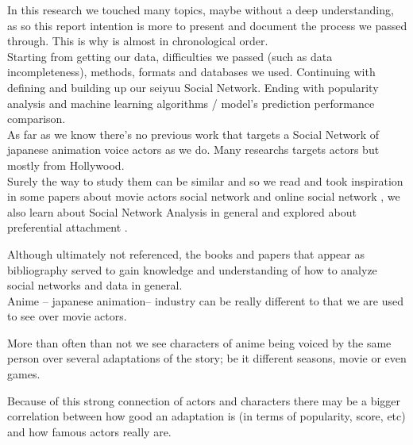In this research we touched many topics, maybe without a deep understanding, as so this report intention is more to present and document the process we passed through. This is why is almost in chronological order.\\

Starting from getting our data, difficulties we passed (such as data incompleteness), methods, formats and databases we used. Continuing with defining and building up our seiyuu Social Network. Ending with popularity analysis and machine learning algorithms / model's prediction performance comparison.\\

As far as we know there's no previous work that targets a Social Network of japanese animation voice actors as we do. Many researchs targets actors but mostly from Hollywood.\\

Surely the way to study them can be similar and so we read and took inspiration in some papers about movie actors social network \cite{creativePerformance} and online social network \cite{NND}, we also learn about Social Network Analysis in general \cite{SNA} and explored about preferential attachment \cite{PFA}. 

Although ultimately not referenced, the books and papers that appear as bibliography served to gain knowledge and understanding of how to analyze social networks and data in general.\\

Anime \--- japanese animation\--- industry can be really different to that we are used to see over movie actors. 

More than often than not we see characters of anime being voiced by the same person over several adaptations of the story; be it different seasons, movie or even games. 

Because of this strong connection of actors and characters there may be a bigger correlation between how good an adaptation is (in terms of popularity, score, etc) and how famous actors really are.\\
